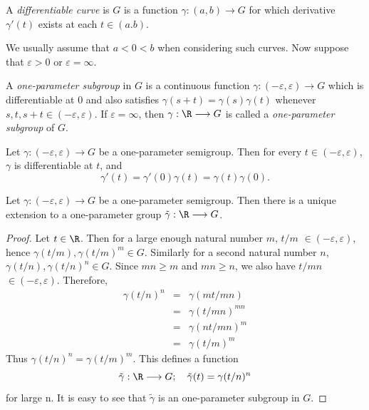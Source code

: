 \begin{definition}
  A {\it differentiable curve} is \(G\) is a function \(\gamma:(a,b)\longrightarrow G\)
  for which derivative \(\gamma'(t)\) exists at each \(t\in(a.b)\).
\end{definition}
We usually assume that \(a<0<b\) when considering such curves.
Now suppose that \(\varepsilon>0\) or \(\varepsilon=\infty\).

\begin{definition}
  A {\it one-parameter subgroup} in \(G\) is a continuous function \(\gamma:(-\varepsilon,\varepsilon)\longrightarrow G\)
  which is differentiable at 0 and also satisfies \(\gamma(s+t)=\gamma(s)\gamma(t)\)
  whenever \(s,t,s+t\in(-\varepsilon,\varepsilon)\). If \(\varepsilon=\infty\), then \(\gamma:\R\longrightarrow G\)
  is called a {\it one-parameter subgroup} of \(G\).
\end{definition}

\begin{proposition}
  Let \(\gamma:(-\varepsilon,\varepsilon)\longrightarrow G\) be a one-parameter semigroup.
  Then for every \(t\in(-\varepsilon,\varepsilon)\), \(\gamma\) is differentiable at \(t\),
  and
  \[ \gamma'(t)=\gamma'(0)\gamma(t)=\gamma(t)\gamma(0). \]
\end{proposition}

\begin{proposition}
  Let \(\gamma:(-\varepsilon,\varepsilon)\longrightarrow G\) be a one-parameter semigroup.
  Then there is a unique extension to a one-parameter group
  \(\tilde{\gamma}:\R\longrightarrow G\).
\end{proposition}

\begin{proof}
  Let \(t\in\R\). Then for a large enough natural number \(m\), \(t/m\) \(\in(-\varepsilon,\varepsilon)\),
  hence \(\gamma(t/m),\gamma(t/m)^m\in G\). Similarly for a second natural number \(n\),
  \(\gamma(t/n),\gamma(t/n)^n\in G\). Since \(mn\ge m\) and \(mn\ge n\), we also have \(t/mn\) \(\in(-\varepsilon,\varepsilon)\).
  Therefore,
  \begin{eqnarray*}
    \gamma(t/n)^n &=& \gamma(mt/mn) \\
                  &=& \gamma(t/mn)^{mn} \\
                  &=& \gamma(nt/mn)^m \\
                  &=& \gamma(t/m)^m
  \end{eqnarray*}
  Thus \(\gamma(t/n)^n=\gamma(t/m)^m\). This defines a function
  \[ \tilde{\gamma}:\R\longrightarrow G;\hspace{10px} \tilde{\gamma}(t)=\gamma(t/n)^n \]
  for large n. It is easy to see that \(\tilde{\gamma}\) is an one-parameter subgroup in \(G\).
\end{proof}

